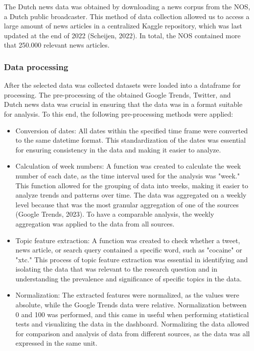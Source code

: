  The Dutch news data was obtained by downloading a news corpus from the NOS, a Dutch public broadcaster. This method of data collection allowed us to access a large amount of news articles in a centralized Kaggle repository, which was last updated at the end of 2022 (Scheijen, 2022). In total, the NOS contained more that 250.000 relevant news articles.

 \subsubsection{Data processing}

 After the selected data was collected datasets were loaded into a dataframe for processing. The pre-processing of the obtained Google Trends, Twitter, and Dutch news data was crucial in ensuring that the data was in a format suitable for analysis. To this end, the following pre-processing methods were applied:

\begin{itemize}
  \item Conversion of dates: All dates within the specified time frame were converted to the same datetime format. This standardization of the dates was essential for ensuring consistency in the data and making it easier to analyze.
  \item Calculation of week numbers: A function was created to calculate the week number of each date, as the time interval used for the analysis was "week." This function allowed for the grouping of data into weeks, making it easier to analyze trends and patterns over time.  The data was aggregated on a weekly level because that was the most granular aggregation of one of the sources (Google Trends, 2023). To have a comparable analysis, the weekly aggregation was applied to the data from all sources.
  \item Topic feature extraction: A function was created to check whether a tweet, news article, or search query contained a specific word, such as "cocaine" or "xtc." This process of topic feature extraction was essential in identifying and isolating the data that was relevant to the research question and in understanding the prevalence and significance of specific topics in the data.
  \item Normalization: The extracted features were normalized, as the values were absolute, while the Google Trends data were relative. Normalization between 0 and 100 was performed, and this came in useful when performing statistical tests and visualizing the data in the dashboard. Normalizing the data allowed for comparison and analysis of data from different sources, as the data was all expressed in the same unit.
\end{itemize}

